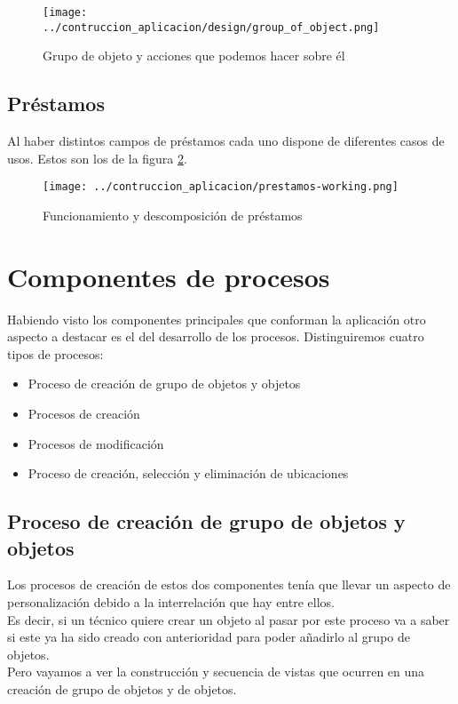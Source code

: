\begin{figure}[h]
    \centering
    \texttt{[image: ../contruccion\_aplicacion/design/group\_of\_object.png]}
    \caption{Grupo de objeto y acciones que podemos hacer sobre él}\label{fig:group-of-object-unit}
\end{figure}


\subsection{Préstamos}
Al haber distintos campos de préstamos cada uno dispone de diferentes casos de usos. Estos son los de la figura \ref{fig:loans-diagram}.

\begin{figure}[h]
    \centering
    \texttt{[image: ../contruccion\_aplicacion/prestamos-working.png]}
    \caption{Funcionamiento y descomposición de préstamos}\label{fig:loans-diagram}
\end{figure}

\section{Componentes de procesos}
Habiendo visto los componentes principales que conforman la aplicación otro aspecto a destacar es el del desarrollo de los procesos. Distinguiremos cuatro tipos de procesos:
\begin{itemize}
    \item Proceso de creación de grupo de objetos y objetos
    \item Procesos de creación
    \item Procesos de modificación
    \item Proceso de creación, selección y eliminación de ubicaciones
\end{itemize}

\subsection{Proceso de creación de grupo de objetos y objetos}
Los procesos de creación de estos dos componentes tenía que llevar un aspecto de personalización debido a la interrelación que hay entre ellos.
\\Es decir, si un técnico quiere crear un objeto al pasar por este proceso va a saber si este ya ha sido creado con anterioridad para poder añadirlo al grupo de objetos.
\\Pero vayamos a ver la construcción y secuencia de vistas que ocurren en una creación de grupo de objetos y de objetos.
